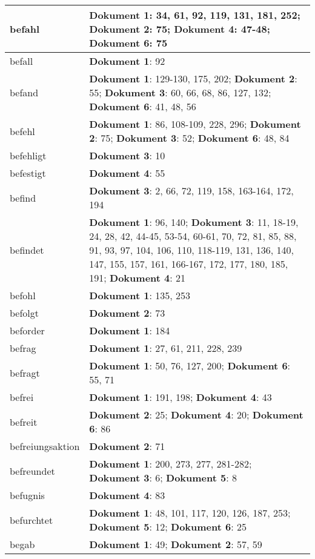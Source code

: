 \documentclass[a5paper]{article}
\begin{document}
\begin{longtable}[l]{|l|p{3in}|}
\hline
befahl & \textbf{Dokument 1}: 34, 61, 92, 119, 131, 181, 252; \textbf{Dokument 2}: 75; \textbf{Dokument 4}: 47-48; \textbf{Dokument 6}: 75 \\
\hline
befall & \textbf{Dokument 1}: 92 \\
\hline
befand & \textbf{Dokument 1}: 129-130, 175, 202; \textbf{Dokument 2}: 55; \textbf{Dokument 3}: 60, 66, 68, 86, 127, 132; \textbf{Dokument 6}: 41, 48, 56 \\
\hline
befehl & \textbf{Dokument 1}: 86, 108-109, 228, 296; \textbf{Dokument 2}: 75; \textbf{Dokument 3}: 52; \textbf{Dokument 6}: 48, 84 \\
\hline
befehligt & \textbf{Dokument 3}: 10 \\
\hline
befestigt & \textbf{Dokument 4}: 55 \\
\hline
befind & \textbf{Dokument 3}: 2, 66, 72, 119, 158, 163-164, 172, 194 \\
\hline
befindet & \textbf{Dokument 1}: 96, 140; \textbf{Dokument 3}: 11, 18-19, 24, 28, 42, 44-45, 53-54, 60-61, 70, 72, 81, 85, 88, 91, 93, 97, 104, 106, 110, 118-119, 131, 136, 140, 147, 155, 157, 161, 166-167, 172, 177, 180, 185, 191; \textbf{Dokument 4}: 21 \\
\hline
befohl & \textbf{Dokument 1}: 135, 253 \\
\hline
befolgt & \textbf{Dokument 2}: 73 \\
\hline
beforder & \textbf{Dokument 1}: 184 \\
\hline
befrag & \textbf{Dokument 1}: 27, 61, 211, 228, 239 \\
\hline
befragt & \textbf{Dokument 1}: 50, 76, 127, 200; \textbf{Dokument 6}: 55, 71 \\
\hline
befrei & \textbf{Dokument 1}: 191, 198; \textbf{Dokument 4}: 43 \\
\hline
befreit & \textbf{Dokument 2}: 25; \textbf{Dokument 4}: 20; \textbf{Dokument 6}: 86 \\
\hline
befreiungsaktion & \textbf{Dokument 2}: 71 \\
\hline
befreundet & \textbf{Dokument 1}: 200, 273, 277, 281-282; \textbf{Dokument 3}: 6; \textbf{Dokument 5}: 8 \\
\hline
befugnis & \textbf{Dokument 4}: 83 \\
\hline
befurchtet & \textbf{Dokument 1}: 48, 101, 117, 120, 126, 187, 253; \textbf{Dokument 5}: 12; \textbf{Dokument 6}: 25 \\
\hline
begab & \textbf{Dokument 1}: 49; \textbf{Dokument 2}: 57, 59 \\
\hline

\end{longtable}
\end{document}
